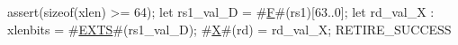 assert(sizeof(xlen) >= 64);
let rs1_val_D            = #\hyperref[sailRISCVzF]{F}#(rs1)[63..0];
let rd_val_X  : xlenbits = #\hyperref[sailRISCVzEXTS]{EXTS}#(rs1_val_D);
#\hyperref[sailRISCVzX]{X}#(rd) = rd_val_X;
RETIRE_SUCCESS
